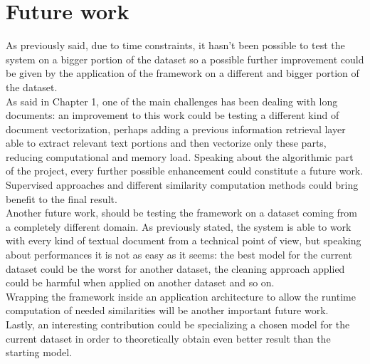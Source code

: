 \documentclass[\main/main.tex]{subfiles}
\begin{document}
\section{Future work}
As previously said, due to time constraints, it hasn't been possible to test the system on a bigger portion of the dataset so a possible further improvement could be given by the application of the framework on a different and bigger portion of the dataset. \\
As said in Chapter 1, one of the main challenges has been dealing with long documents: an improvement to this work could be testing a different kind of document vectorization, perhaps adding a previous information retrieval layer able to extract relevant text portions and then vectorize only these parts, reducing computational and memory load. Speaking about the algorithmic part of the project, every further possible enhancement could constitute a future work. Supervised approaches and different similarity computation methods could bring benefit to the final result.\\
Another future work, should be testing the framework on a dataset coming from a completely different domain. As previously stated, the system is able to work with every kind of textual document from a technical point of view, but speaking about performances it is not as easy as it seems: the best model for the current dataset could be the worst for another dataset, the cleaning approach applied could be harmful when applied on another dataset and so on.\\
Wrapping the framework inside an application architecture to allow the runtime computation of needed similarities will be another important future work. \\
Lastly, an interesting contribution could be specializing a chosen model for the current dataset in order to theoretically obtain even better result than the starting model.
\newpage
\newpage
\end{document}
